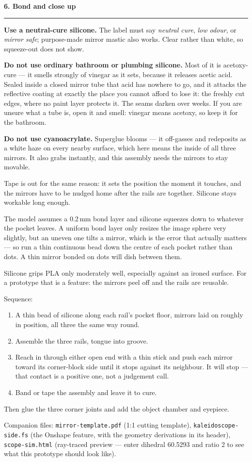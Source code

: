 \documentclass[letterpaper,11pt]{article}
\newcommand{\head}[1]{\vspace{3mm}\textbf{\large #1}\vspace{1mm}\hrule\vspace{2mm}}
\begin{document}
\head{6. Bond and close up}

\textbf{Use a neutral-cure silicone.} The label must say \emph{neutral cure}, \emph{low
odour}, or \emph{mirror safe}; purpose-made mirror mastic also works. Clear rather than
white, so squeeze-out does not show.

\textbf{Do not use ordinary bathroom or plumbing silicone.} Most of it is acetoxy-cure ---
it smells strongly of vinegar as it sets, because it releases acetic acid. Sealed inside a
closed mirror tube that acid has nowhere to go, and it attacks the reflective coating at
exactly the place you cannot afford to lose it: the freshly cut edges, where no paint layer
protects it. The seams darken over weeks. If you are unsure what a tube is, open it and
smell: vinegar means acetoxy, so keep it for the bathroom.

\textbf{Do not use cyanoacrylate.} Superglue blooms --- it off-gasses and redeposits as a
white haze on every nearby surface, which here means the inside of all three mirrors. It
also grabs instantly, and this assembly needs the mirrors to stay movable.

Tape is out for the same reason: it sets the position the moment it touches, and the mirrors
have to be nudged home after the rails are together. Silicone stays workable long enough.

The model assumes a 0.2\,mm bond layer and silicone squeezes down to whatever the pocket
leaves. A uniform bond layer only resizes the image sphere very slightly, but an uneven one
tilts a mirror, which is the error that actually matters --- so run a thin continuous bead
down the centre of each pocket rather than dots. A thin mirror bonded on dots will dish
between them.

Silicone grips PLA only moderately well, especially against an ironed surface. For a
prototype that is a feature: the mirrors peel off and the rails are reusable.

Sequence:

\begin{enumerate}[leftmargin=*]
\item A thin bead of silicone along each rail's pocket floor, mirrors laid on roughly in
      position, all three the same way round.
\item Assemble the three rails, tongue into groove.
\item Reach in through either open end with a thin stick and push each mirror toward its
      corner-block side until it stops against its neighbour. It will stop --- that contact
      is a positive one, not a judgement call.
\item Band or tape the assembly and leave it to cure.
\end{enumerate}

Then glue the three corner joints and add the object chamber and eyepiece.

\vfill
{\footnotesize\color{reg}
Companion files: \texttt{mirror-template.pdf} (1:1 cutting template),
\texttt{kaleidoscope-side.fs} (the Onshape feature, with the geometry derivations in its
header), \texttt{scope-sim.html} (ray-traced preview --- enter dihedral 60.5293 and ratio 2
to see what this prototype should look like).}
\end{document}
